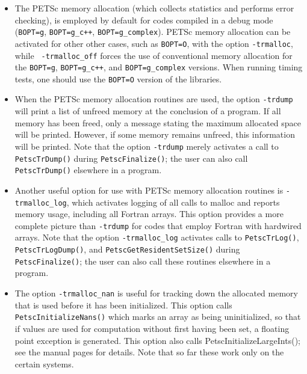  
\begin{itemize}
\item The PETSc memory allocation (which collects statistics and performs
error checking), is employed by default for codes compiled in a
debug mode ({\tt BOPT=g}, {\tt BOPT=g\_c++}, {\tt BOPT=g\_complex}).
PETSc memory allocation can be activated for other other cases, such
as {\tt BOPT=O}, with the option {\tt -trmalloc}, while {\tt
-trmalloc\_off} forces the use of conventional memory allocation for the
{\tt BOPT=g}, {\tt BOPT=g\_c++}, and {\tt BOPT=g\_complex} versions.
When running timing tests, one should use  
the {\tt BOPT=O} version of the libraries.

 
\item When the PETSc memory allocation routines are used, the option 
{\tt -trdump} will print a list of unfreed memory at the conclusion of a
program.  If all memory has been freed, only a message stating
the maximum allocated space will be printed.  However, if some memory
remains unfreed, this information will be printed.  Note that the
option {\tt -trdump} merely activates a call to {\tt PetscTrDump()} during
{\tt PetscFinalize()}; the user can also call {\tt PetscTrDump()} elsewhere
in a program.

 
 
\item Another useful option for use with PETSc memory allocation
routines is {\tt -trmalloc\_log}, which activates logging of all calls
to malloc and reports memory usage, including all Fortran arrays.
This option provides a more complete picture than {\tt -trdump} for
codes that employ Fortran with hardwired arrays.  Note that the option
{\tt -trmalloc\_log} activates calls to {\tt PetscTrLog()}, {\tt
PetscTrLogDump()}, and {\tt PetscGetResidentSetSize()} during {\tt
PetscFinalize()}; the user can also call these routines elsewhere in a
program.

 
\item The option {\tt -trmalloc\_nan} is useful for tracking down the
allocated memory that is used before it has been initialized.  This
option calls {\tt PetscInitializeNans()} which marks an array as being
uninitialized, so that if values are used for computation without
first having been set, a floating point exception is generated.  This
option also calls {PetscInitializeLargeInts()}; see the manual pages for
details.  Note that so far these work only on the certain systems.


\end{itemize}
